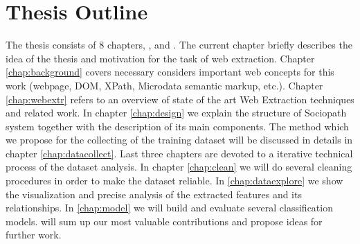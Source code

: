 \section{Thesis Outline}
The thesis consists of 8 chapters, ,  and . The current chapter briefly describes the idea of the thesis and motivation for the task of web extraction. Chapter \ref{chap:background} covers necessary considers important web concepts for this work (webpage, DOM, XPath, Microdata semantic markup, etc.). Chapter \ref{chap:webextr} refers to an overview of state of the art Web Extraction techniques and related work. In chapter \ref{chap:design} we explain the structure of Sociopath system together with the description of its main components. The method which we propose for the collecting of the training dataset will be discussed in details in chapter \ref{chap:datacollect}. Last three chapters are devoted to a iterative technical process of the dataset analysis. In chapter \ref{chap:clean} we will do several cleaning procedures in order to make the dataset reliable. In \ref{chap:dataexplore} we show the visualization and precise analysis of the extracted features and its relationships. In \ref{chap:model} we will build  and evaluate several classification models.  will sum up our most valuable contributions and propose ideas for further work.